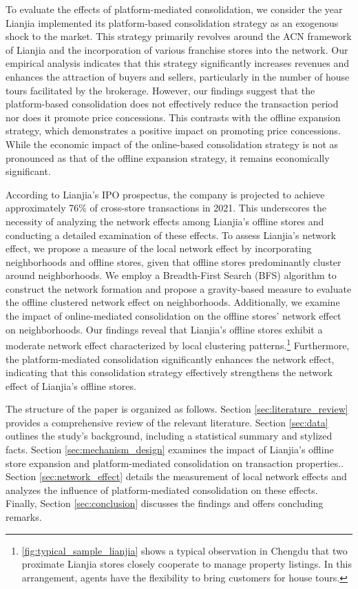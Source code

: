 \documentclass[11pt]{article}
\begin{document}
To evaluate the effects of platform-mediated consolidation, we consider the year Lianjia implemented its platform-based consolidation strategy as an exogenous shock to the market. This strategy primarily revolves around the ACN framework of Lianjia and the incorporation of various franchise stores into the network. Our empirical analysis indicates that this strategy significantly increases revenues and enhances the attraction of buyers and sellers, particularly in the number of house tours facilitated by the brokerage. However, our findings suggest that the platform-based consolidation does not effectively reduce the transaction period nor does it promote price concessions. This contrasts with the offline expansion strategy, which demonstrates a positive impact on promoting price concessions. While the economic impact of the online-based consolidation strategy is not as pronounced as that of the offline expansion strategy, it remains economically significant.

According to Lianjia's IPO prospectus, the company is projected to achieve approximately 76\% of cross-store transactions in 2021. This underscores the necessity of analyzing the network effects among Lianjia's offline stores and conducting a detailed examination of these effects. To assess Lianjia's network effect, we propose a measure of the local network effect by incorporating neighborhoods and offline stores, given that offline stores predominantly cluster around neighborhoods. We employ a Breadth-First Search (BFS) algorithm to construct the network formation and propose a gravity-based measure to evaluate the offline clustered network effect on neighborhoods. Additionally, we examine the impact of online-mediated consolidation on the offline stores' network effect on neighborhoods. Our findings reveal that Lianjia's offline stores exhibit a moderate network effect characterized by local clustering patterns.\footnote{\ref{fig:typical_sample_lianjia} shows a typical observation in Chengdu that two proximate Lianjia stores closely cooperate to manage property listings. In this arrangement, agents have the flexibility to bring customers for house tours.} Furthermore, the platform-mediated consolidation significantly enhances the network effect, indicating that this consolidation strategy effectively strengthens the network effect of Lianjia's offline stores.

The structure of the paper is organized as follows. Section \ref{sec:literature_review} provides a comprehensive review of the relevant literature. Section \ref{sec:data} outlines the study's background, including a statistical summary and stylized facts. Section \ref{sec:mechanism_design} examines the impact of Lianjia's offline store expansion and platform-mediated consolidation on transaction properties.. Section \ref{sec:network_effect} details the measurement of local network effects and analyzes the influence of platform-mediated consolidation on these effects. Finally, Section \ref{sec:conclusion} discusses the findings and offers concluding remarks.
\end{document}
